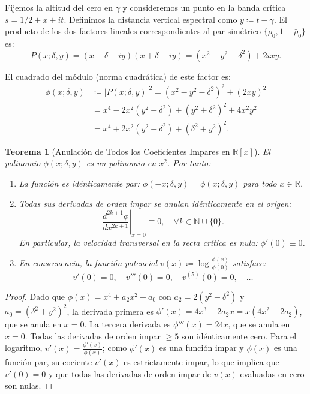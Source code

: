 \documentclass[11pt,a4paper]{article}
\newtheorem{theorem}{Teorema}[section]
\theoremstyle{definition}
\theoremstyle{remark}
\begin{document}
Fijemos la altitud del cero en $\gamma$ y consideremos un punto en la banda crítica $s = 1/2 + x + it$. Definimos la distancia vertical espectral como $y \coloneqq t - \gamma$. El producto de los dos factores lineales correspondientes al par simétrico $\{\rho_0, 1 - \bar{\rho}_0\}$ es:
\begin{equation}
P(x; \delta, y) = (x - \delta + iy)(x + \delta + iy) = (x^2 - y^2 - \delta^2) + 2ixy.
\end{equation}

El cuadrado del módulo (norma cuadrática) de este factor es:
\begin{align}
\phi(x; \delta, y) &\coloneqq |P(x; \delta, y)|^2 = (x^2 - y^2 - \delta^2)^2 + (2xy)^2 \nonumber \\
&= x^4 - 2x^2(y^2 + \delta^2) + (y^2 + \delta^2)^2 + 4x^2y^2 \nonumber \\
&= x^4 + 2x^2(y^2 - \delta^2) + (\delta^2 + y^2)^2.
\end{align}

\begin{theorem}[{Anulación de Todos los Coeficientes Impares en $\mathbb{R}[x]$}]
El polinomio $\phi(x; \delta, y)$ es un polinomio en $x^2$. Por tanto:
\begin{enumerate}
    \item La función es idénticamente par: $\phi(-x; \delta, y) = \phi(x; \delta, y)$ para todo $x \in \mathbb{R}$.
    \item Todas sus derivadas de orden impar se anulan idénticamente en el origen:
    \begin{equation}
    \left. \frac{d^{2k+1}\phi}{dx^{2k+1}} \right|_{x=0} \equiv 0, \quad \forall k \in \mathbb{N} \cup \{0\}.
    \end{equation}
    En particular, la velocidad transversal en la recta crítica es nula: $\phi'(0) \equiv 0$.
    \item En consecuencia, la función potencial $v(x) \coloneqq \log \frac{\phi(x)}{\phi(0)}$ satisface:
    \begin{equation}
    v'(0) = 0, \quad v'''(0) = 0, \quad v^{(5)}(0) = 0, \quad \dots
    \end{equation}
\end{enumerate}
\end{theorem}

\begin{proof}
Dado que $\phi(x) = x^4 + a_2 x^2 + a_0$ con $a_2 = 2(y^2 - \delta^2)$ y $a_0 = (\delta^2 + y^2)^2$, la derivada primera es $\phi'(x) = 4x^3 + 2a_2 x = x(4x^2 + 2a_2)$, que se anula en $x = 0$. La tercera derivada es $\phi'''(x) = 24x$, que se anula en $x = 0$. Todas las derivadas de orden impar $\ge 5$ son idénticamente cero. Para el logaritmo, $v'(x) = \frac{\phi'(x)}{\phi(x)}$; como $\phi'(x)$ es una función impar y $\phi(x)$ es una función par, su cociente $v'(x)$ es estrictamente impar, lo que implica que $v'(0) = 0$ y que todas las derivadas de orden impar de $v(x)$ evaluadas en cero son nulas.
\end{proof}
\end{document}
